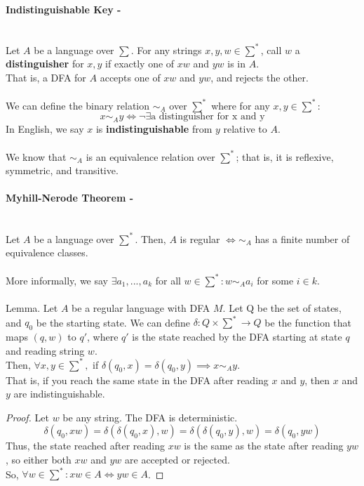 \documentclass{article}
\begin{document}
    \paragraph{Indistinguishable Key - }\\
    Let $A$ be a language over $\sum$. For any strings $x,y,w \in \sum^*$, call $w$ a \textbf{distinguisher} for $x,y$ if exactly one of $xw$ and $yw$ is in $A$.\\
    That is, a DFA for $A$ accepts one of $xw$ and $yw$, and rejects the other.\\
    \\
    We can define the binary relation $\sim_A$ over $\sum^*$ where for any $x,y \in \sum^*$:
    $$x \sim_A y \iff \neg\exists \text{a distinguisher for x and y}$$
    In English, we say $x$ is \textbf{indistinguishable} from $y$ relative to $A$.\\
    \\
    We know that $\sim_A$ is an equivalence relation over $\sum^*$; that is, it is reflexive, symmetric, and transitive.\\
    \paragraph{Myhill-Nerode Theorem -}\\
    Let $A$ be a language over $\sum^*$. Then, $A$ is regular $\iff \sim_A$ has a finite number of equivalence classes.\\
    \\
    More informally, we say $\exists a_1, ..., a_k$ for all $w \in \sum^* : w \sim_A a_i$ for some $i \in k$.\\
    \\
    Lemma. Let $A$ be a regular language with DFA $M$. Let Q be the set of states, and $q_0$ be the starting state. We can define $\delta: Q \times \sum^* \to Q$ be the function that maps $(q,w)$ to $q'$, where $q'$ is the state reached by the DFA starting at state $q$ and reading string $w$.\\
    Then, $\forall x,y \in \sum^*,$ if $\delta(q_0, x) = \delta(q_0, y) \implies x\sim_A y$.\\
    That is, if you reach the same state in the DFA after reading $x$ and $y$, then $x$ and $y$ are indistinguishable.
    \begin{proof}
    Let $w$ be any string. The DFA is deterministic.
    $$\delta(q_0, xw) = \delta(\delta(q_0, x), w) = \delta(\delta(q_0, y), w) = \delta(q_0, yw)$$
    Thus, the state reached after reading $xw$ is the same as the state after reading $yw$, so either both $xw$ and $yw$ are accepted or rejected.\\
    So, $\forall w \in \sum^*: xw \in A \iff yw \in A$.
    \end{proof}
\end{document}
